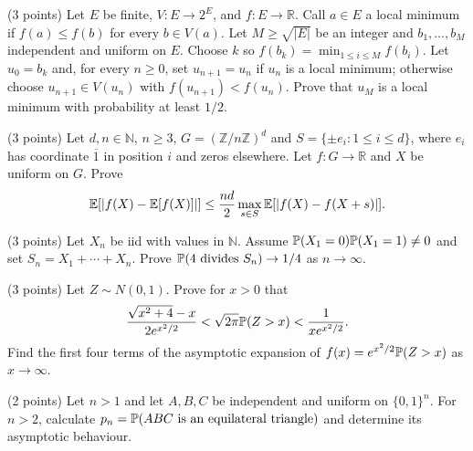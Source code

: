 \documentclass[a4paper]{report}
\begin{document}
\begin{problem} (3 points)
Let $E$ be finite, $V:E\to2^E$, and $f:E\to\mathbb R$. Call $a\in E$ a local minimum if $f(a)\leq f(b)$ for every $b\in V(a)$.
Let $M\geq\sqrt{|E|}$ be an integer and $b_1,\ldots,b_M$ independent and uniform on $E$. Choose $k$ so $f(b_k)=\min_{1\leq i\leq M}f(b_i)$.
Let $u_0=b_k$ and, for every $n\geq0$, set $u_{n+1}=u_n$ if $u_n$ is a local minimum; otherwise choose $u_{n+1}\in V(u_n)$ with $f(u_{n+1})<f(u_n)$. Prove that $u_M$ is a local minimum with probability at least $1/2$.
\end{problem}
\begin{problem} (3 points)
Let $d,n\in\mathbb N$, $n\geq3$, $G=(\mathbb Z/n\mathbb Z)^d$ and $S=\{\pm e_i:1\leq i\leq d\}$, where $e_i$ has coordinate $\overline1$ in position $i$ and zeros elsewhere. Let $f:G\to\mathbb R$ and $X$ be uniform on $G$. Prove
\[\E[|f(X)-\E[f(X)]|]\leq\frac{nd}{2}\max_{s\in S}\E[|f(X)-f(X+s)|].\]
\end{problem}
\begin{problem} (3 points)
Let $X_n$ be iid with values in $\mathbb N$. Assume $\P(X_1=0)\P(X_1=1)\neq0$ and set $S_n=X_1+\cdots+X_n$. Prove $\P(4\text{ divides }S_n)\to1/4$ as $n\to\infty$.
\end{problem}
\begin{problem} (3 points)
Let $Z\sim N(0,1)$. Prove for $x>0$ that
\[\frac{\sqrt{x^2+4}-x}{2e^{x^2/2}}<\sqrt{2\pi}\P(Z>x)<\frac1{xe^{x^2/2}}.\]
Find the first four terms of the asymptotic expansion of $f(x)=e^{x^2/2}\P(Z>x)$ as $x\to\infty$.
\end{problem}
\begin{problem} (2 points)
Let $n>1$ and let $A,B,C$ be independent and uniform on $\{0,1\}^n$. For $n>2$, calculate $p_n=\P(ABC\text{ is an equilateral triangle})$ and determine its asymptotic behaviour.
\end{problem}
\end{document}
